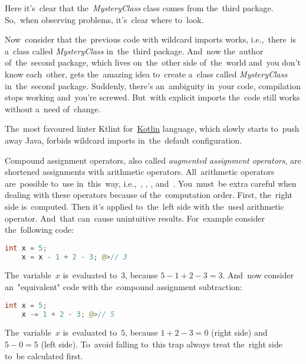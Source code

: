 \noindent Here it's~clear that the~\textit{MysteryClass} class comes from the~third package.
So,~when observing problems, it's~clear where to~look.

Now~consider that the~previous code with wildcard imports works, i.e.,~there~is a~class called \textit{MysteryClass} in~the~third package.
And~now the~author of~the~second package, which lives on~the~other side of~the~world and~you don't know each~other, gets the~amazing idea to~create a~class called \textit{MysteryClass} in~the~second package.
Suddenly, there's an~ambiguity in~your code, compilation stops working and~you're screwed.
But~with explicit imports the~code still works without a~need of~change.

\note The~most favoured linter Ktlint for~\hyperref[kotlin]{Kotlin} language, which slowly starts to~push away Java, forbids wildcard imports in~the~default configuration.

Compound assignment operators, also called \textit{augmented assignment operators}, are shortened assignments with arithmetic operators.
All~arithmetic operators are~possible to~use in~this~way, \mbox{i.e., \itqs{+=}}, \mbitqs{-=}, \mbitqs{$\star$=}, \mbitqs{/=} \mbox{and \itqs{\%=}}.
You~must~be extra careful when dealing with these operators because of the~computation order.
First, the~right side is~computed.
Then it's applied to~the~left side with the~used arithmetic operator.
And~that can~cause unintuitive results.
For~example consider the~following code:
\begin{lstlisting}[language=Java, frame=no]
    int x = 5;
    x = x - 1 + 2 - 3; @>// 3
\end{lstlisting}

\noindent The~variable~$x$ is~evaluated to~$3$, because $5-1+2-3=3$.
And~now consider an~"equivalent" code with the~compound assignment subtraction:
\begin{lstlisting}[language=Java, frame=no]
    int x = 5;
    x -= 1 + 2 - 3; @>// 5
\end{lstlisting}

\noindent The~variable~$x$ is~evaluated to~$5$, because $1+2-3=0$ (right side) and~$5-0=5$ (left side).
To~avoid falling to~this trap always treat the~right side to~be calculated first.

\label{serialization}

